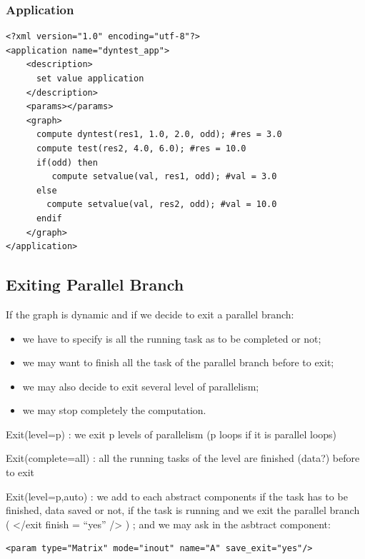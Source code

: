 \subsubsection{Application}

\lstset{language=XML}
\begin{lstlisting}[frame=single]
<?xml version="1.0" encoding="utf-8"?>
<application name="dyntest_app">
    <description>
      set value application
    </description>
    <params></params>
    <graph>
      compute dyntest(res1, 1.0, 2.0, odd); #res = 3.0
      compute test(res2, 4.0, 6.0); #res = 10.0
      if(odd) then
         compute setvalue(val, res1, odd); #val = 3.0
      else
        compute setvalue(val, res2, odd); #val = 10.0
      endif
    </graph>
</application>
\end{lstlisting}


\subsection{Exiting Parallel Branch}

If the graph is dynamic and if we decide to exit a parallel branch:

\begin{itemize}
	\item we have to specify is all the running task as to be completed or not;
	\item we may want to finish all the task of the parallel branch before to exit;
	\item we may also decide to exit several level of parallelism;
	\item we may stop completely the computation.
\end{itemize}

Exit(level=p) : we exit p levels of parallelism (p loops if it is parallel loops)

Exit(complete=all) : all the running tasks of the level are finished (data?) before to exit

Exit(level=p,auto) : we add to each abstract components if the task has to be finished, data saved or not, if the task is running and we exit the parallel branch ( </exit finish = “yes” />  ) ; 
and we may ask in the asbtract component:

\lstset{language=XML}
\begin{lstlisting}[frame=single]
<param type="Matrix" mode="inout" name="A" save_exit="yes"/>
\end{lstlisting}

